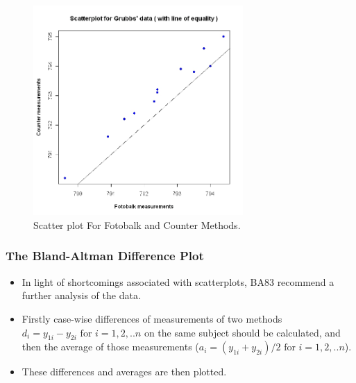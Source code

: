 \documentclass[compress]{beamer}        %
\begin{document}
\begin{frame}
\begin{figure}[h!]
\begin{center}
  \includegraphics[width=80mm]{GrubbsScatter.jpeg}
  \caption{Scatter plot For Fotobalk and Counter Methods.}\label{GrubbsScatter}
\end{center}
\end{figure}
\end{frame}
\begin{frame}
\frametitle{The Bland-Altman Difference Plot}
\begin{itemize}
\item In light of shortcomings associated with scatterplots,
\alert{BA83} recommend a further analysis of the data. 
\item Firstly
case-wise differences of measurements of two methods $d_{i} =
y_{1i}-y_{2i} \mbox{ for }i=1,2,..n$ on the same subject should be
calculated, and then the average of those measurements ($a_{i} =
(y_{1i} + y_{2i})/2 \mbox{ for }i=1,2,..n$). 
\item These differences and
averages are then plotted. 
\end{itemize}

\end{frame}
\end{document}

